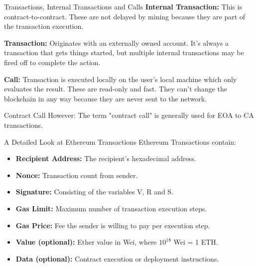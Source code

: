 \documentclass[handout]{beamer}
\begin{document}
\begin{frame}{Transactions, Internal Transactions and Calls}
\textbf{Internal Transaction:} This is contract-to-contract. These are not delayed by mining because they are part of the transaction execution.
\vspace{1em}

\textbf{Transaction:} Originates with an externally owned account. It's always a transaction that gets things started, but multiple internal transactions may be fired off to complete the action.
\vspace{1em}

\textbf{Call:} Transaction is executed locally on the user's local machine which only evaluates the result. These are read-only and fast. They can't change the blockchain in any way because they are never sent to the network. 


\vspace{1em}

\begin{alertblock}{Contract Call}
				However: The term "contract call" is generally used for EOA to CA transactions.
			\end{alertblock}

\end{frame}

\begin{frame}{A Detailed Look at Ethereum Transactions}
Ethereum Transactions contain:
	\begin{itemize}
		\item<1-> \textbf{Recipient Address:} The recipient's hexadecimal 		address.
		\item<2-> \textbf{Nonce:} Transaction count from sender.
		\item<3-> \textbf{Signature:} Consisting of the variables V, R and S.
		\item<4-> \textbf{Gas Limit:} Maximum number of transaction execution steps.
		\item<5-> \textbf{Gas Price:} Fee the sender is willing to pay per execution step. 
		\item<6-> \textbf{Value (optional):} Ether value in Wei, where $10^{18}$ Wei = 1 ETH. 
		\item<7-> \textbf{Data (optional):} Contract execution or deployment instructions.
	\end{itemize}

\end{frame}
\end{document}
